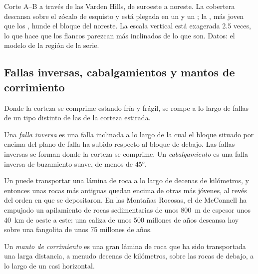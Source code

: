 \begin{omfigure}
{\small Corte A--B a través de las Varden Hills, de suroeste a noreste. La
cobertera descansa sobre el zócalo de esquisto y está plegada en un 
y un ; la , más joven que los , hunde el bloque
del noreste. La escala vertical está exagerada 2.5 veces, lo que hace que los
flancos parezcan más inclinados de lo que son. Datos: el modelo de la región
de la serie.}
\end{omfigure}

\subsection{Fallas inversas, cabalgamientos y mantos de corrimiento}

Donde la corteza se comprime estando fría y frágil, se rompe a lo largo de
fallas de un tipo distinto de las  de la corteza estirada.

\begin{definition}\label{def:g12:mountain-building:thrust}
Una \emph{falla inversa} es una falla inclinada a lo largo
de la cual el bloque situado por encima del plano de falla ha subido respecto
al bloque de debajo. Las fallas inversas se forman donde la corteza se
comprime. Un \emph{cabalgamiento} es una falla inversa de
buzamiento suave, de menos de \ang{45}.
\end{definition}

Un  puede transportar una lámina de roca a lo largo de decenas de
kilómetros, y entonces unas rocas más antiguas quedan encima de otras más
jóvenes, al revés del orden en que se depositaron. En las Montañas Rocosas, el
 de McConnell ha empujado un apilamiento de rocas sedimentarias de
unos \qty{800}{m} de espesor unos \qty{40}{km} de oeste a este: una caliza de
unos 500 millones de años descansa hoy sobre una fangolita de unos 75 millones
de años.

\begin{definition}\label{def:g12:mountain-building:nappe}
Un \emph{manto de corrimiento} es una gran lámina
de roca que ha sido transportada una larga distancia, a menudo decenas de
kilómetros, sobre las rocas de debajo, a lo largo de un  casi
horizontal.
\end{definition}

